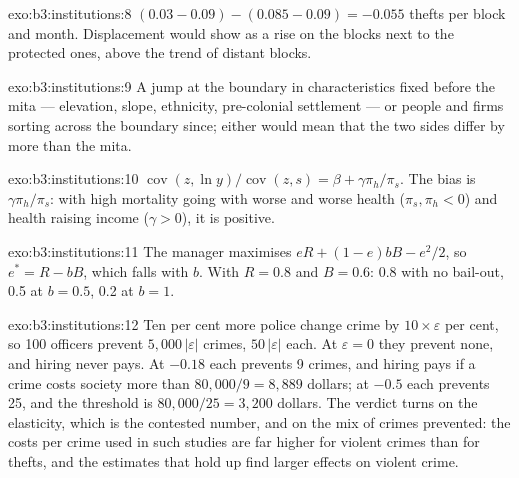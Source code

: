 \begin{solution}{exo:b3:institutions:8}
$(0.03 - 0.09) - (0.085 - 0.09) = -0.055$ thefts per block and month. Displacement would show as a rise on the
blocks next to the protected ones, above the trend of distant blocks.
\end{solution}

\begin{solution}{exo:b3:institutions:9}
A jump at the boundary in characteristics fixed before the mita --- elevation, slope,
ethnicity, pre-colonial settlement --- or people and firms sorting across the
boundary since; either would mean that the two sides differ by more than the mita.
\end{solution}

\begin{solution}{exo:b3:institutions:10}
$\operatorname{cov}(z, \ln y)/\operatorname{cov}(z, s) = \beta + \gamma\pi_h/\pi_s$. The bias is $\gamma\pi_h/\pi_s$: with high mortality going with worse  and
worse health ($\pi_s, \pi_h < 0$) and health raising income ($\gamma > 0$), it is positive.
\end{solution}

\begin{solution}{exo:b3:institutions:11}
The manager maximises $eR + (1 - e)bB - e^2/2$, so $e^* = R - bB$, which falls with $b$. With $R = 0.8$ and $B = 0.6$: 0.8 with no
bail-out, 0.5 at $b = 0.5$, 0.2 at $b = 1$.
\end{solution}

\begin{solution}{exo:b3:institutions:12}
Ten per cent more police change crime by $10 \times \varepsilon$ per cent, so 100 officers prevent $5{,}000\,|\varepsilon|$ crimes,
$50\,|\varepsilon|$ each. At $\varepsilon = 0$ they prevent none, and hiring never pays. At $-0.18$ each prevents 9 crimes, and
hiring pays if a crime costs society more than $80{,}000/9 = 8{,}889$ dollars; at $-0.5$ each prevents 25,
and the threshold is $80{,}000/25 = 3{,}200$ dollars. The verdict turns on the elasticity, which is
the contested number, and on the mix of crimes prevented: the costs per crime used in
such studies are far higher for violent crimes than for thefts, and the estimates that
hold up find larger effects on violent crime. %
\end{solution}

